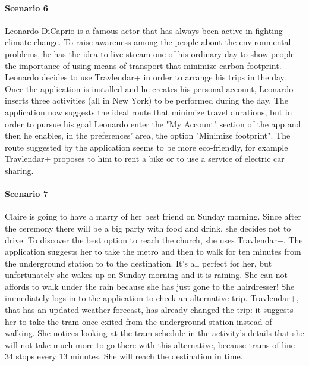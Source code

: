 \documentclass[12pt,titlepage]{article}
\begin{document}
\paragraph{Scenario 6}
Leonardo DiCaprio is a famous actor that has always been active in fighting climate change. To raise awareness among the people about the environmental problems, he has the idea to live stream one of his ordinary day to show people the importance of using means of transport that minimize carbon footprint. 
Leonardo decides to use Travlendar+ in order to arrange his trips in the day. Once the application is installed and he creates his personal account, Leonardo inserts three activities (all in New York) to be performed during the day. The application now suggests the ideal route that minimize travel durations, but in order to pursue his goal Leonardo enter the "My Account" section of the app and then he enables, in the preferences' area, the option "Minimize footprint". The route suggested by the application seems to be more eco-friendly, for example Travlendar+ proposes to him to rent a bike or to use a service of electric car sharing.

\paragraph{Scenario 7}
Claire is going to have a marry of her best friend on Sunday morning. Since after the ceremony there will be a big party with food and drink, she decides not to drive. To discover the best option to reach the church, she uses Travlendar+. The application suggests her to take the metro and then to walk for ten minutes from the underground station to to the destination. It's all perfect for her, but unfortunately she wakes up on Sunday morning and it is raining. She can not affords to walk under the rain because she has just gone to the hairdresser! She immediately logs in to the application to check an alternative trip. Travlendar+, that has an updated weather forecast, has already changed the trip: it suggests her to take the tram once exited from the underground station instead of walking. She notices looking at the tram schedule in the activity's details that she will not take much more to go there with this alternative, because trams of line 34 stops every 13 minutes. She will reach the destination in time.
\end{document}
